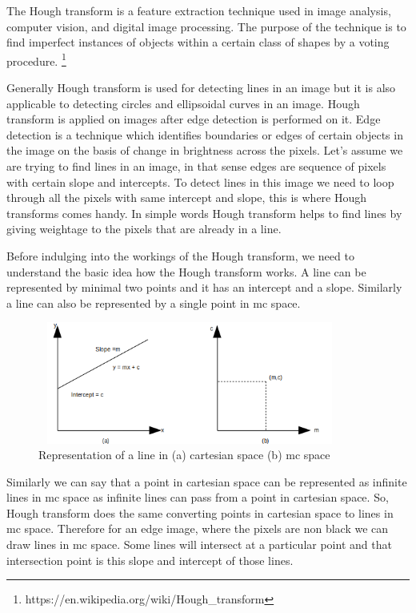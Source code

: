     The Hough transform is a feature extraction technique used in image analysis, computer vision, and digital image processing. The purpose of the technique is to find imperfect instances of objects within a certain class of shapes by a voting procedure. \footnote{https://en.wikipedia.org/wiki/Hough_transform}
    
    Generally Hough transform is used for detecting lines in an image but it is also applicable to detecting circles and ellipsoidal curves in an image. Hough transform is applied on images after edge detection is performed on it. Edge detection is a technique which identifies boundaries or edges of certain objects in the image on the basis of change in brightness across the pixels. Let's assume we are trying to find lines in an image, in that sense edges are sequence of pixels with certain slope and intercepts. To detect lines in this image we need to loop through all the pixels with same intercept and slope, this is where Hough transforms comes handy. In simple words Hough transform helps to find lines by giving weightage to the pixels that are already in a line. 
    
    Before indulging into the workings of the Hough transform, we need to understand the basic idea how the Hough transform works. A line can be represented by minimal two points and it has an intercept and a slope. Similarly a line can also be represented by a single point in mc space.
    
                \begin{figure}[h]
    \centering
    \includegraphics[width=10cm, height =4cm]{images/hough1.png}
    \caption{Representation of a line in (a) cartesian space (b) mc space}
    \end{figure}
    
    Similarly we can say that a point in cartesian space can be represented as infinite lines in mc space as infinite lines can pass from a point in cartesian space. So, Hough transform does the same converting points in cartesian space to lines in mc space. Therefore for an edge image, where the pixels are non black we can draw lines in mc space. Some lines will intersect at a particular point and that intersection point is this slope and intercept of those lines. 
    
